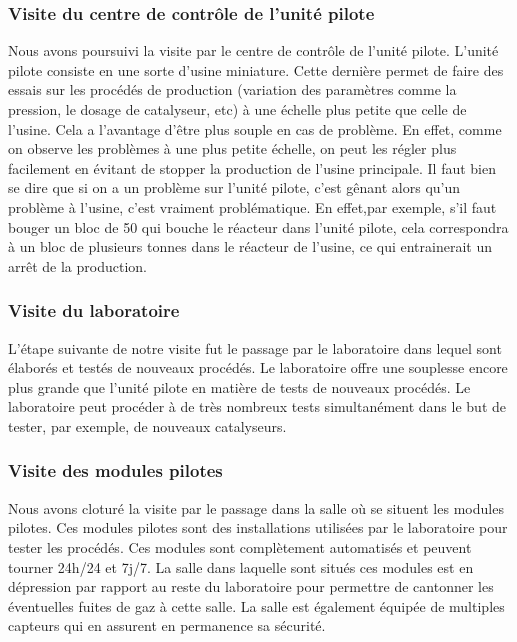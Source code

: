 \subsubsection{Visite du centre de contrôle de l'unité pilote}
Nous avons poursuivi la visite par le centre de contrôle de l'unité pilote. L'unité pilote consiste en une sorte d'usine miniature. Cette dernière permet de faire des essais sur les procédés de production (variation des paramètres comme la pression, le dosage de catalyseur, etc) à une échelle plus petite que celle de l'usine. Cela a l'avantage d'être plus souple en cas de problème. En effet, comme on observe les problèmes à une plus petite échelle, on peut les régler plus facilement en évitant de stopper la production de l'usine principale. Il faut bien se dire que si on a un problème sur l'unité pilote, c'est gênant alors qu'un problème à l'usine, c'est vraiment problématique. En effet,par exemple, s'il faut bouger un bloc de \unit{50}{\kilo \gram} qui bouche le réacteur dans l'unité pilote, cela correspondra à un bloc de plusieurs tonnes dans le réacteur de l'usine, ce qui entrainerait un arrêt de la production.

\subsubsection{Visite du laboratoire}
L'étape suivante de notre visite fut le passage par le laboratoire dans lequel sont élaborés et testés de nouveaux procédés. Le laboratoire offre une souplesse encore plus grande que l'unité pilote en matière de tests de nouveaux procédés. Le laboratoire peut procéder à de très nombreux tests simultanément dans le but de tester, par exemple, de nouveaux catalyseurs.

\subsubsection{Visite des modules pilotes}
Nous avons cloturé la visite par le passage dans la salle où se situent les modules pilotes. Ces modules pilotes sont des installations utilisées par le laboratoire pour tester les procédés. Ces modules sont complètement automatisés et peuvent tourner 24h/24 et 7j/7. La salle dans laquelle sont situés ces modules est en dépression par rapport au reste du laboratoire pour permettre de cantonner les éventuelles fuites de gaz à cette salle. La salle est également équipée de multiples capteurs qui en assurent en permanence sa sécurité.

